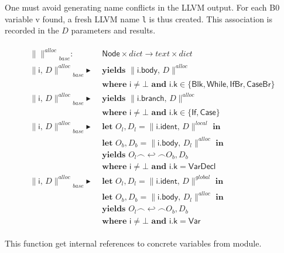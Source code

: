 \documentclass{article}
\newcommand{\trad}[2]{\ensuremath{\lVert \textsf{#1} \rVert^{\textit{#2}}}}
\newcommand{\nl}[0]{\ensuremath{\hookleftarrow}}
\DeclareMathOperator{\conc}{\smallfrown}
\DeclareMathOperator{\isdef}{\blacktriangleright}
\begin{document}
One must avoid generating name conflicts in the LLVM output. For each
B0 variable \textsf{v} found, a fresh LLVM name \texttt{l} is thus
created. This association is recorded in the $D$ parameters and results.
\begin{framed}
  \begin{align}
\begin{split}
    \trad{}{alloc}_{base} : & \textsf{ Node} \times dict \rightarrow text \times dict \\
    \trad{i, $D$}{alloc}_{base} \isdef 
    & \textbf{ yields } \trad{i.body, $D$}{alloc}  \\
    & \textbf{ where } \textsf{i} \ne \bot \textbf{ and } \textsf{i.k} \in \{\textsf{Blk}, \textsf{While}, \textsf{IfBr}, \textsf{CaseBr} \}  \\
    \trad{i, $D$}{alloc}_{base} \isdef 
    & \textbf{ yields } \trad{i.branch, $D$}{alloc}  \\
    & \textbf{ where } \textsf{i} \ne \bot \textbf{ and } \textsf{i.k} \in \{\textsf{If}, \textsf{Case} \}  \\
    \trad{i, $D$}{alloc}_{base} \isdef 
    & \textbf{ let } O_l, D_l = \trad{i.ident, $D$}{local} \textbf{ in}  \\
    & \textbf{ let } O_b, D_b = \trad{i.body, $D_l$}{alloc} \textbf{ in}  \\
    & \textbf{ yields } O_l \conc \nl \conc O_b, D_b  \\
    & \textbf{ where } \textsf{i} \ne \bot \textbf{ and } \textsf{i.k} = \textsf{VarDecl} \\
    \trad{i, $D$}{alloc}_{base} \isdef 
    & \textbf{ let } O_l, D_l = \trad{i.ident, $D$}{global} \textbf{ in}  \\
    & \textbf{ let } O_b, D_b = \trad{i.body, $D_l$}{alloc} \textbf{ in}  \\
    & \textbf{ yields } O_l \conc \nl \conc O_b, D_b  \\
    & \textbf{ where } \textsf{i} \ne \bot \textbf{ and } \textsf{i.k} = \textsf{Var} 
  \end{split}
\end{align}
\end{framed}

This function get internal references to concrete variables from module.
\end{document}
